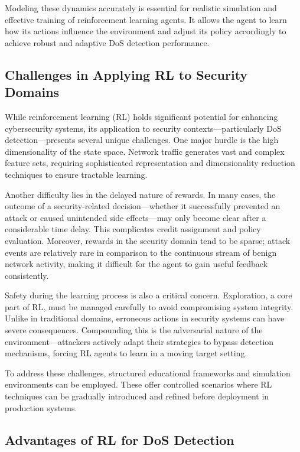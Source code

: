 \documentclass{report}
\begin{document}
Modeling these dynamics accurately is essential for realistic simulation and effective training of reinforcement learning agents. It allows the agent to learn how its actions influence the environment and adjust its policy accordingly to achieve robust and adaptive DoS detection performance.



\subsection{Challenges in Applying RL to Security Domains}

While reinforcement learning (RL) holds significant potential for enhancing cybersecurity systems, its application to security contexts—particularly DoS detection—presents several unique challenges. One major hurdle is the high dimensionality of the state space. Network traffic generates vast and complex feature sets, requiring sophisticated representation and dimensionality reduction techniques to ensure tractable learning. 

Another difficulty lies in the delayed nature of rewards. In many cases, the outcome of a security-related decision—whether it successfully prevented an attack or caused unintended side effects—may only become clear after a considerable time delay. This complicates credit assignment and policy evaluation. Moreover, rewards in the security domain tend to be sparse; attack events are relatively rare in comparison to the continuous stream of benign network activity, making it difficult for the agent to gain useful feedback consistently.

Safety during the learning process is also a critical concern. Exploration, a core part of RL, must be managed carefully to avoid compromising system integrity. Unlike in traditional domains, erroneous actions in security systems can have severe consequences. Compounding this is the adversarial nature of the environment—attackers actively adapt their strategies to bypass detection mechanisms, forcing RL agents to learn in a moving target setting.

To address these challenges, structured educational frameworks and simulation environments can be employed. These offer controlled scenarios where RL techniques can be gradually introduced and refined before deployment in production systems.

\subsection{Advantages of RL for DoS Detection}
\end{document}
